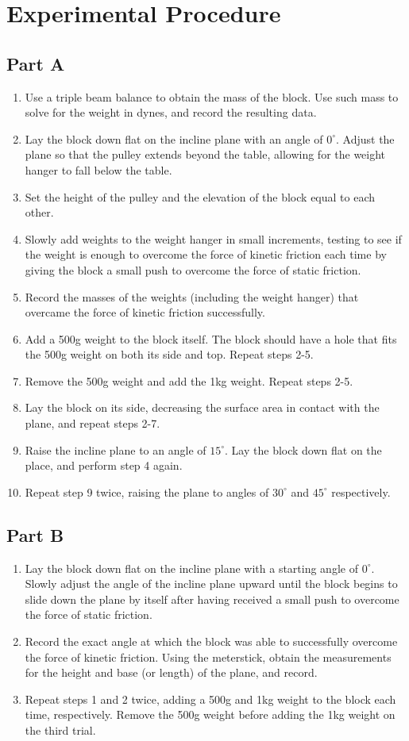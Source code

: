 \documentclass{article}
\theoremstyle{definition}
\begin{document}
\section{Experimental Procedure}
\subsection*{Part A}
\begin{enumerate}
    \item Use a triple beam balance to obtain the mass of the block. Use such mass to solve for the weight in dynes, and record the resulting data.
    \item Lay the block down flat on the incline plane with an angle of $0^{\circ}$. Adjust the plane so that the pulley extends beyond the table, allowing for the weight hanger to fall below the table.
    \item Set the height of the pulley and the elevation of the block equal to each other.
    \item Slowly add weights to the weight hanger in small increments, testing to see if the weight is enough to overcome the force of kinetic friction each time by giving the block a small push to overcome the force of static friction.
    \item Record the masses of the weights (including the weight hanger) that overcame the force of kinetic friction successfully.
    \item Add a 500g weight to the block itself. The block should have a hole that fits the 500g weight on both its side and top. Repeat steps 2-5. 
    \item Remove the 500g weight and add the 1kg weight. Repeat steps 2-5.
    \item Lay the block on its side, decreasing the surface area in contact with the plane, and repeat steps 2-7.
    \item Raise the incline plane to an angle of $15^{\circ}$. Lay the block down flat on the place, and perform step 4 again.
    \item Repeat step 9 twice, raising the plane to angles of $30^{\circ}$ and $45^{\circ}$ respectively.
\end{enumerate}
\subsection*{Part B}
\begin{enumerate}
    \item Lay the block down flat on the incline plane with a starting angle of $0^{\circ}$. Slowly adjust the angle of the incline plane upward until the block begins to slide down the plane by itself after having received a small push to overcome the force of static friction.
    \item Record the exact angle at which the block was able to successfully overcome the force of kinetic friction. Using the meterstick, obtain the measurements for the height and base (or length) of the plane, and record.
    \item Repeat steps 1 and 2 twice, adding a 500g and 1kg weight to the block each time, respectively. Remove the 500g weight before adding the 1kg weight on the third trial. 
\end{enumerate}
\end{document}
